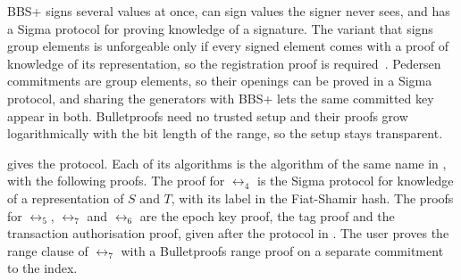 BBS+ signs several values at once, can sign values the signer never sees, and
has a Sigma protocol for proving knowledge of a signature. The variant that signs
group elements is unforgeable only if every signed element comes with a proof of
knowledge of its representation, so the registration proof is
required~\cite{SCN:AuSusMu06,EC:TesZhu23b}. Pedersen commitments are group
elements, so their openings can be proved in a Sigma protocol, and sharing the
generators with BBS+ lets the same committed key appear in both. Bulletproofs
need no trusted setup and their proofs grow logarithmically with the bit length
of the range, so the setup stays transparent.

 gives the protocol. Each of its algorithms is the algorithm of
the same name in , with the following proofs. The proof
for $\rel_4$ is the Sigma protocol for knowledge of a representation of $S$ and
$T$, with its label in the Fiat-Shamir hash. The proofs for $\rel_5$, $\rel_7$
and $\rel_6$ are the epoch key proof, the tag proof and the transaction
authorisation proof, given after the protocol in
. The user
proves the range clause of $\rel_7$ with a Bulletproofs range proof on a
separate commitment to the index.

